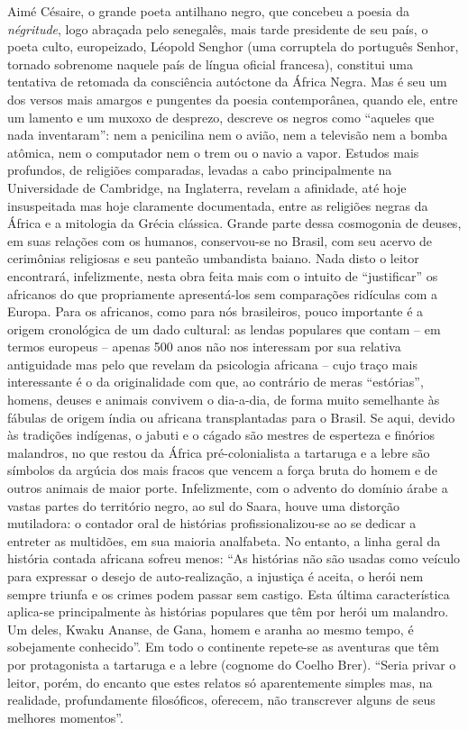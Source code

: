 \documentclass[
  letterpaper,
  DIV=11,
  numbers=noendperiod]{scrreprt}
\begin{document}
Aimé Césaire, o grande poeta antilhano negro, que concebeu a poesia da
\emph{négritude}, logo abraçada pelo senegalês, mais tarde presidente de
seu país, o poeta culto, europeizado, Léopold Senghor (uma corruptela do
português Senhor, tornado sobrenome naquele país de língua oficial
francesa), constitui uma tentativa de retomada da consciência autóctone
da África Negra. Mas é seu um dos versos mais amargos e pungentes da
poesia contemporânea, quando ele, entre um lamento e um muxoxo de
desprezo, descreve os negros como ``aqueles que nada inventaram'': nem a
penicilina nem o avião, nem a televisão nem a bomba atômica, nem o
computador nem o trem ou o navio a vapor. Estudos mais profundos, de
religiões comparadas, levadas a cabo principalmente na Universidade de
Cambridge, na Inglaterra, revelam a afinidade, até hoje insuspeitada mas
hoje claramente documentada, entre as religiões negras da África e a
mitologia da Grécia clássica. Grande parte dessa cosmogonia de deuses,
em suas relações com os humanos, conservou-se no Brasil, com seu acervo
de cerimônias religiosas e seu panteão umbandista baiano. Nada disto o
leitor encontrará, infelizmente, nesta obra feita mais com o intuito de
``justificar'' os africanos do que propriamente apresentá-los sem
comparações ridículas com a Europa. Para os africanos, como para nós
brasileiros, pouco importante é a origem cronológica de um dado
cultural: as lendas populares que contam -- em termos europeus -- apenas
500 anos não nos interessam por sua relativa antiguidade mas pelo que
revelam da psicologia africana -- cujo traço mais interessante é o da
originalidade com que, ao contrário de meras ``estórias'', homens,
deuses e animais convivem o dia-a-dia, de forma muito semelhante às
fábulas de origem índia ou africana transplantadas para o Brasil. Se
aqui, devido às tradições indígenas, o jabuti e o cágado são mestres de
esperteza e finórios malandros, no que restou da África pré-colonialista
a tartaruga e a lebre são símbolos da argúcia dos mais fracos que vencem
a força bruta do homem e de outros animais de maior porte. Infelizmente,
com o advento do domínio árabe a vastas partes do território negro, ao
sul do Saara, houve uma distorção mutiladora: o contador oral de
histórias profissionalizou-se ao se dedicar a entreter as multidões, em
sua maioria analfabeta. No entanto, a linha geral da história contada
africana sofreu menos: ``As histórias não são usadas como veículo para
expressar o desejo de auto-realização, a injustiça é aceita, o herói nem
sempre triunfa e os crimes podem passar sem castigo. Esta última
característica aplica-se principalmente às histórias populares que têm
por herói um malandro. Um deles, Kwaku Ananse, de Gana, homem e aranha
ao mesmo tempo, é sobejamente conhecido''. Em todo o continente
repete-se as aventuras que têm por protagonista a tartaruga e a lebre
(cognome do Coelho Brer). ``Seria privar o leitor, porém, do encanto que
estes relatos só aparentemente simples mas, na realidade, profundamente
filosóficos, oferecem, não transcrever alguns de seus melhores
momentos''.
\end{document}
